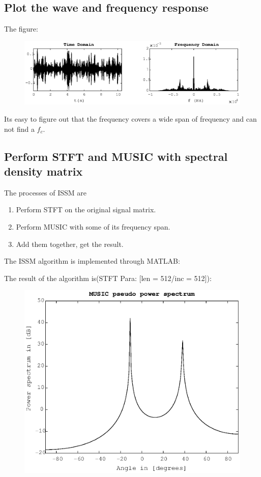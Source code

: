 \documentclass[UTF8]{article}
\begin{document}
\subsection{Plot the wave and frequency response}
The figure:
\begin{figure}[H]
    \centering 
    \includegraphics[scale=0.7]{img/fig03.eps}\\
\end{figure}
Its easy to figure out that the frequency covers a wide span of frequency and can not find a $f_c$.

\subsection{Perform STFT and MUSIC with spectral density matrix}
\hspace{0.5em} The processes of ISSM are
\begin{enumerate}
    \item Perform STFT on the original signal matrix.
    \item Perform MUSIC with some of its frequency span.
    \item Add them together, get the result.
\end{enumerate}

The ISSM algorithm is implemented through MATLAB:



The result of the algorithm is(STFT Para: [len = 512/inc = 512]):

\begin{figure}[H]
    \centering
    \includegraphics[scale=0.5]{img/fig04.eps} \\
\end{figure}
\end{document}
